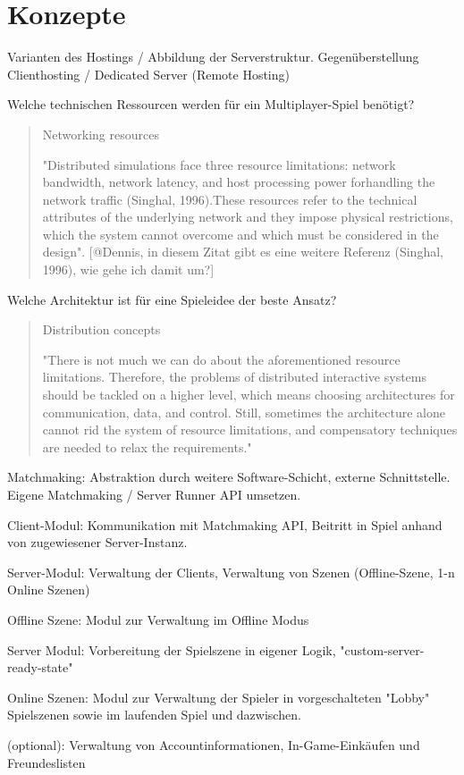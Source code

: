 \chapter{Konzepte}
\label{sec:konzepte}

Varianten des Hostings / Abbildung der Serverstruktur. Gegenüberstellung Clienthosting / Dedicated Server (Remote Hosting)

Welche technischen Ressourcen werden für ein Multiplayer-Spiel benötigt?

\begin{quote}
	Networking resources
	
	"Distributed simulations face three resource limitations: network bandwidth, network 
	latency, and host processing power forhandling the network traffic (Singhal, 1996).These resources refer to the technical attributes of the underlying network and they impose physical restrictions, which the system cannot overcome and which must be considered in the design". \cite{Smed.2002} [@Dennis, in diesem Zitat gibt es eine weitere Referenz (Singhal, 1996), wie gehe ich damit um?]
\end{quote}

Welche Architektur ist für eine Spieleidee der beste Ansatz? 

\begin{quote}
	Distribution concepts
	
	"There is not much we can do about the aforementioned resource limitations. Therefore, the problems of distributed interactive systems should be tackled on a higher level, which means choosing architectures for communication, data, and control. Still, sometimes the architecture alone cannot rid the system of resource limitations, and compensatory techniques are needed to relax the requirements." \cite{Smed.2002}
\end{quote}

Matchmaking: Abstraktion durch weitere Software-Schicht, externe Schnittstelle. Eigene Matchmaking / Server Runner API umsetzen.

Client-Modul: Kommunikation mit Matchmaking API, Beitritt in Spiel anhand von zugewiesener Server-Instanz.

Server-Modul: Verwaltung der Clients, Verwaltung von Szenen (Offline-Szene, 1-n Online Szenen)

Offline Szene: Modul zur Verwaltung im Offline Modus

Server Modul: Vorbereitung der Spielszene in eigener Logik, "custom-server-ready-state"

Online Szenen: Modul zur Verwaltung der Spieler in vorgeschalteten "Lobby" Spielszenen sowie im laufenden Spiel und dazwischen.

(optional): Verwaltung von Accountinformationen, In-Game-Einkäufen und Freundeslisten        